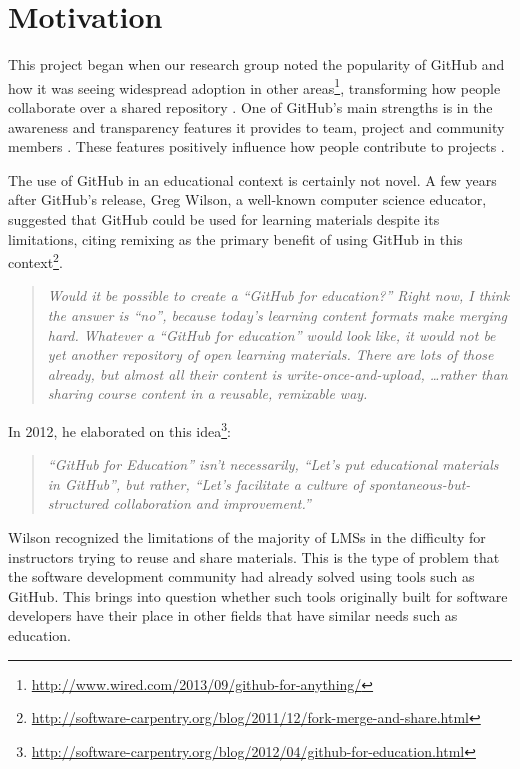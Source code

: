 \section{Motivation}
This project began when our research group noted the popularity of GitHub and how it was seeing widespread adoption in other areas\footnote{\url{http://www.wired.com/2013/09/github-for-anything/}}, transforming how people collaborate over a shared repository \cite{begel2013social}. One of GitHub's main strengths is in the awareness and transparency features it provides to team, project and community members \cite{dabbish2012social}. These features positively influence how people contribute to projects \cite{Tsay:2012:SMS:2141512.2141583}.

The use of GitHub in an educational context is certainly not novel. A few years after GitHub's release, Greg Wilson, a well-known computer science educator, suggested that GitHub could be used for learning materials despite its limitations, citing remixing as the primary benefit of using GitHub in this context\footnote{\url{http://software-carpentry.org/blog/2011/12/fork-merge-and-share.html}}.

\begin{quote}\textit{Would it be possible to create a ``GitHub for education?'' Right now, I think the answer is ``no'', because today's learning content formats make merging hard. Whatever a ``GitHub for education'' would look like, it would not be yet another repository of open learning materials. There are lots of those already, but almost all their content is write-once-and-upload, \ldots rather than sharing course content in a reusable, remixable way.}\end{quote}

In 2012, he elaborated on this idea\footnote{\url{http://software-carpentry.org/blog/2012/04/github-for-education.html}}:

\begin{quote}\textit{``GitHub for Education'' isn't necessarily, ``Let's put educational materials in GitHub'', but rather, ``Let's facilitate a culture of spontaneous-but-structured collaboration and improvement.''}\end{quote}

Wilson recognized the limitations of the majority of LMSs in the difficulty for instructors trying to reuse and share materials. This is the type of problem that the software development community had already solved using tools such as GitHub. This brings into question whether such tools originally built for software developers have their place in other fields that have similar needs such as education.

